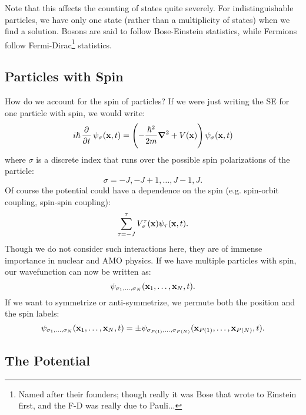 Note that this affects the counting of states quite severely. For indistinguishable particles, we have only one state (rather than a multiplicity of states) when we find a solution. Bosons are said to follow Bose-Einstein statistics, while Fermions follow Fermi-Dirac\footnote{Named after their founders; though really it was Bose that wrote to Einstein first, and the F-D was really due to Pauli...} statistics.

\subsection{Particles with Spin}
How do we account for the spin of particles? If we were just writing the SE for one particle with spin, we would write:
\begin{equation}
    i\hbar\dpd{}{t}\psi_\sigma(\v{x}, t) = \left(-\frac{\hbar^2}{2m}\nabla^2 + V(\v{x})\right)\psi_\sigma(\v{x}, t)
\end{equation}
where $\sigma$ is a discrete index that runs over the possible spin polarizations of the particle:
\begin{equation}
    \sigma = -J, -J + 1, \ldots, J-1, J.
\end{equation}
Of course the potential could have a dependence on the spin (e.g. spin-orbit coupling, spin-spin coupling):
\begin{equation}
    \sum_{\tau=-J}^\tau V_\sigma^\tau(\mathbf{x})\psi_\tau(\mathbf{x}, t).
\end{equation}
Though we do not consider such interactions here, they are of immense importance in nuclear and AMO physics. If we have multiple particles with spin, our wavefunction can now be written as:
\begin{equation}
    \psi_{\sigma_1, \ldots, \sigma_N}(\mathbf{x}_1, \ldots, \mathbf{x}_N, t).
\end{equation}
If we want to symmetrize or anti-symmetrize, we permute both the position and the spin labels:
\begin{equation}
    \psi_{\sigma_1, \ldots, \sigma_N}(\mathbf{x}_1, \ldots, \mathbf{x}_N, t) = \pm \psi_{\sigma_{P(1)}, \ldots, \sigma_{P(N)}}(\mathbf{x}_{P(1)}, \ldots, \mathbf{x}_{P(N)}, t).
\end{equation}


\subsection{The Potential}

